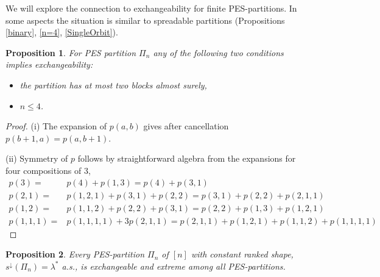 \documentclass{article}
\newtheorem{proposition}{Proposition}
\begin{document}
We will explore the connection to exchangeability  for finite PES-partitions.
In some aspects the situation is similar to spreadable partitions (Propositions \ref{binary}, \ref{n=4}, \ref{SingleOrbit}).


\begin{proposition} For PES partition $\Pi_n$ any of the following two conditions implies  exchangeability:
\begin{itemize}
\item[\rm (i)] the partition has at most two blocks almost surely,
\item[\rm (ii)] $n\leq 4$.
\end{itemize}
\end{proposition}

\begin{proof}
(i) The expansion of $p(a,b)$ gives after cancellation $p(b+1,a)=p(a,b+1)$.

\noindent
(ii) Symmetry of $p$  follows by straightforward algebra from the expansions for four compositions of $3$,  
\begin{eqnarray*}
p(3)  = &p(4) + p(1,3) = p(4) + p(3,1) \\
p(2,1)=& p(1,2,1) + p(3,1) + p(2,2) = p(3,1) + p(2,2) + p(2,1,1) \\
p(1,2) = &p(1,1,2) + p(2,2) + p(3,1) = p(2,2) + p(1,3) + p(1,2,1) \\
p(1,1,1)= &p(1,1,1,1) + 3 p(2,1,1)  = p(2,1,1) + p(1,2,1) + p(1,1,2) + p(1,1,1,1)
\end{eqnarray*}
\end{proof}


\begin{proposition}
Every PES-partition $\Pi_n$ of $[n]$ with constant ranked shape, $s^\downarrow(\Pi_n)=\lambda^*$ a.s., is exchangeable and extreme among all PES-partitions.
\end{proposition}
\end{document}

